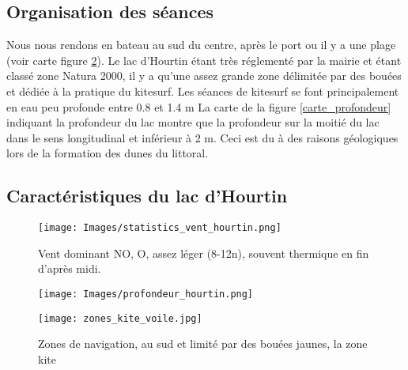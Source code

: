 \documentclass[11pt,a4paper]{report}
\begin{document}
\subsection{Organisation des séances}
Nous nous rendons en bateau au sud du centre, après le port ou il y a 
une plage (voir carte figure \ref{zones_nav}). Le lac d'Hourtin étant très 
réglementé par la mairie et étant classé zone Natura 2000\cite{natura2000}, 
il y a qu'une assez grande zone délimitée par des bouées et dédiée à la pratique
du kitesurf.
Les séances de kitesurf se font principalement en eau peu profonde entre 0.8 et 1.4 m
La carte de la figure \ref{carte_profondeur} indiquant la profondeur du lac
montre que la profondeur sur la moitié du lac dans le sens longitudinal 
et inférieur à 2 m. Ceci est du à des raisons géologiques lors de la
formation des dunes du littoral.

\subsection{Caractéristiques du lac d'Hourtin}
\begin{figure}
\centering
\texttt{[image: Images/statistics\_vent\_hourtin.png]} 
\caption{Vent dominant NO, O, assez léger (8-12n), 
souvent thermique en fin d'après midi.\label{vent_stats}}
\end{figure}

\begin{figure}
\begin{minipage}{0.4\textwidth}
\texttt{[image: Images/profondeur\_hourtin.png]} 
\caption{Profondeur du lac d'Hourtin, la profondeur est inférieure
à 2m sur la moitié est du lac (limite 2 m en vert)\label{carte_profondeur}}
\end{minipage}
\hfill
\begin{minipage}{0.4\textwidth}
\texttt{[image: zones\_kite\_voile.jpg]} 
\caption{Zones de navigation, au sud et limité par des bouées jaunes,
 la zone kite\label{zones_nav}}
 \end{minipage}
\end{figure}
\end{document}
